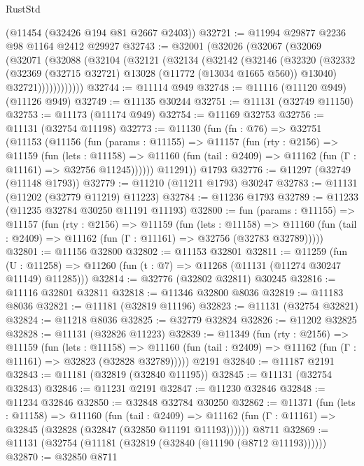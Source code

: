 \begin{lexlean}{RustStd}
\begin{coremodule}
    (@11454 (@32426 @194 @81 @2667 @2403))
@32721 := @11994 @29877 @2236 @98 @1164 @2412 @29927
@32743 := @32001
    (@32026
      (@32067
        (@32069
          (@32071
            (@32088
              (@32104
                (@32121
                  (@32134
                    (@32142
                      (@32146
                        (@32320
                          (@32332
                            (@32369 (@32715 @32721) @13028 (@11772 (@13034 @1665 @560)) @13040)
                            @32721))))))))))))
@32744 := @11114 @949
@32748 := @11116 (@11120 @949) (@11126 @949)
@32749 := @11135 @30244
@32751 := @11131 (@32749 @11150)
@32753 := @11173 (@11174 @949)
@32754 := @11169 @32753
@32756 := @11131 (@32754 @11198)
@32773 := @11130
    (fun (fn : @76) =>
    @32751
      (@11153
        (@11156
          (fun (params : @11155) =>
          @11157
            (fun (rty : @2156) =>
            @11159
              (fun (lets : @11158) =>
              @11160 (fun (tail : @2409) => @11162 (fun (Γ : @11161) => @32756 @11245))))))
        @11291))
    @1793
@32776 := @11297 (@32749 (@11148 @1793))
@32779 := @11210 (@11211 @1793) @30247
@32783 := @11131 (@11202 (@32779 @11219) @11223)
@32784 := @11236 @1793
@32789 := @11233 (@11235 @32784 @30250 @11191 @11193)
@32800 := fun (params : @11155) =>
  @11157
    (fun (rty : @2156) =>
    @11159
      (fun (lets : @11158) =>
      @11160 (fun (tail : @2409) => @11162 (fun (Γ : @11161) => @32756 (@32783 @32789)))))
@32801 := @11156 @32800
@32802 := @11153 @32801
@32811 := @11259
    (fun (U : @11258) => @11260 (fun (t : @7) => @11268 (@11131 (@11274 @30247 @11149) @11285)))
@32814 := @32776 (@32802 @32811) @30245
@32816 := @11116 @32801 @32811
@32818 := @11346 @32800 @8036
@32819 := @11183 @8036
@32821 := @11181 (@32819 @11196)
@32823 := @11131 (@32754 @32821)
@32824 := @11218 @8036
@32825 := @32779 @32824
@32826 := @11202 @32825
@32828 := @11131 (@32826 @11223)
@32839 := @11349
    (fun (rty : @2156) =>
    @11159
      (fun (lets : @11158) =>
      @11160 (fun (tail : @2409) => @11162 (fun (Γ : @11161) => @32823 (@32828 @32789)))))
    @2191
@32840 := @11187 @2191
@32843 := @11181 (@32819 (@32840 @11195))
@32845 := @11131 (@32754 @32843)
@32846 := @11231 @2191
@32847 := @11230 @32846
@32848 := @11234 @32846
@32850 := @32848 @32784 @30250
@32862 := @11371
    (fun (lets : @11158) =>
    @11160
      (fun (tail : @2409) =>
      @11162 (fun (Γ : @11161) => @32845 (@32828 (@32847 (@32850 @11191 @11193))))))
    @8711
@32869 := @11131 (@32754 (@11181 (@32819 (@32840 (@11190 (@8712 @11193))))))
@32870 := @32850 @8711

\end{coremodule}
\end{lexlean}
